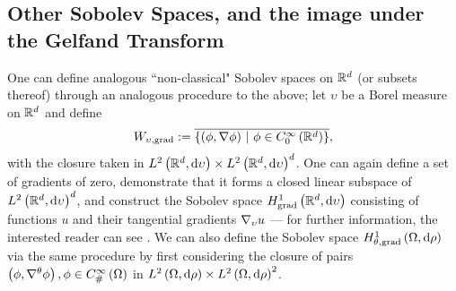 
\subsection{Other Sobolev Spaces, and the image under the Gelfand Transform} \label{ssec:SobSpacesAndGelfand}
One can define analogous ``non-classical" Sobolev spaces on $\mathbb{R}^d$ (or subsets thereof) through an analogous procedure to the above; let $\upsilon$ be a Borel measure on $\mathbb{R}^d$ and define
\begin{align*}
	W_{\upsilon,\mathrm{grad}} := \overline{ \left\{  \left( \phi, \nabla\phi \right) \ \middle\vert \  \phi\in C^{\infty}_{0}\left( \mathbb{R}^d \right)  \right\} },
\end{align*}
with the closure taken in $L^{2}\left( \mathbb{R}^d,\mathrm{d} \upsilon \right)\times L^{2}\left( \mathbb{R}^d,\mathrm{d} \upsilon \right)^d$.
One can again define a set of gradients of zero, demonstrate that it forms a closed linear subspace of $L^{2}\left( \mathbb{R}^d,\mathrm{d} \upsilon \right)^d$, and construct the Sobolev space $H^1_\mathrm{grad}\left( \mathbb{R}^d, \mathrm{d}\upsilon \right)$ consisting of functions $u$ and their tangential gradients $\nabla_{\upsilon}u$ --- for further information, the interested reader can see .
We can also define the Sobolev space $H^1_{\theta, \mathrm{grad}}\left( \Omega, \mathrm{d}\rho \right)$ via the same procedure by first considering the closure of pairs $\left( \phi, \nabla^{\theta}\phi \right), \phi\in C^{\infty}_{\#}\left( \Omega \right)$ in $L^{2}\left( \Omega,\mathrm{d} \rho \right)\times L^{2}\left( \Omega,\mathrm{d} \rho \right)^2$.

